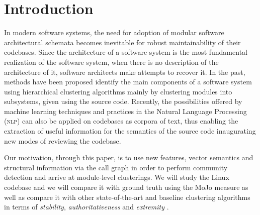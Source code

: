 \documentclass[sigconf,review, anonymous]{acmart}
\begin{document}
%



\maketitle

\section{Introduction}




In modern software systems, the need for adoption of modular software architectural schemata 
becomes inevitable for robust maintainability of their codebases.
Since the architecture of a software system is the most fundamental realization of the 
software system, when there is no description of the architecture of it, software 
architects make attempts to recover it. In the past, methods have been proposed 
identify the main components of a software system using hierarchical clustering 
algorithms \cite{maqbool_overview, limbo} mainly by clustering modules into subsystems, given 
using the source code.    
Recently, the possibilities offered by machine learning techniques and practices in the Natural Language Processing (\textsc{nlp}) 
can also be applied on codebases as corpora of text, thus enabling 
the extraction of useful information for the semantics of the source code 
inaugurating new modes of reviewing the codebase. 

Our motivation, through this paper, is to use new features, vector semantics and structural information via the call graph in order to perform community detection and arrive at module-level clusterings. 
We will study the Linux codebase and we will compare it with ground truth  using the MoJo measure \cite{mojo} as well as 
compare it with other state-of-the-art and baseline clustering algorithms  in terms of \emph{stability}, \emph{authoritativeness} and \emph{extremity}
\cite{maqbool_overview, evaluation}.
\end{document}
